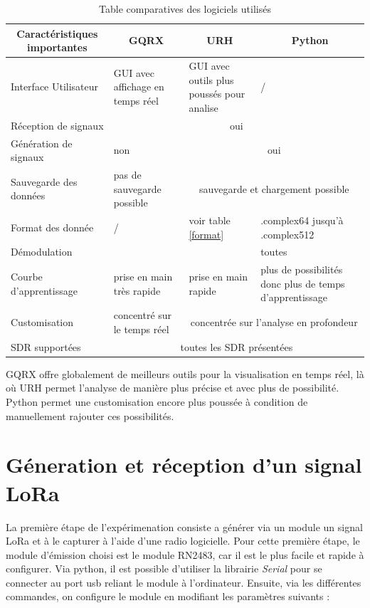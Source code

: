 \begin{table}[h]
\centering
\begin{tabular}{|p{4cm}|p{2cm}|p{2cm}|p{3cm}|}
\hline
\multicolumn{1}{|c|}{Caractéristiques importantes} & \multicolumn{1}{c|}{GQRX} & \multicolumn{1}{c|}{URH} & \multicolumn{1}{c|}{Python}\\
\hline
Interface Utilisateur & GUI avec affichage en temps réel & GUI avec outils plus poussés pour analise & / \\
\hline
Réception de signaux & \multicolumn{3}{c|}{oui} \\
\hline
Génération de signaux & non & \multicolumn{2}{c|}{oui} \\
\hline
Sauvegarde des données & pas de sauvegarde possible & \multicolumn{2}{c|}{sauvegarde et chargement possible} \\
\hline
Format des donnée & / & voir table \ref{format} & .complex64 jusqu'à .complex512 \\
\hline
Démodulation &  &  & toutes\\
\hline
Courbe d'apprentissage & prise en main très rapide & prise en main rapide & plus de possibilités donc plus de temps d'apprentissage \\
\hline
Customisation & concentré sur le temps réel & \multicolumn{2}{c|}{concentrée sur l'analyse en profondeur} \\
\hline
SDR supportées & \multicolumn{3}{c|}{toutes les SDR présentées} \\
\hline
\end{tabular}
\caption{Table comparatives des logiciels utilisés}
\label{table2}
\end{table}

GQRX offre globalement de meilleurs outils pour la visualisation en temps réel, là où URH permet l'analyse de manière plus précise et avec plus de possibilité. Python permet une customisation encore plus poussée à condition de manuellement rajouter ces possibilités.

\section{Géneration et réception d'un signal LoRa} \label{signallora}

La première étape de l'expérimenation consiste a générer via un module un signal LoRa et à le capturer à l'aide d'une radio logicielle. Pour cette première étape, le module d'émission choisi est le module RN2483, car il est le plus facile et rapide à configurer.
Via python, il est possible d'utiliser la librairie \textit{Serial} pour se connecter au port usb reliant le module à l'ordinateur. Ensuite, via les différentes commandes, on configure le module en modifiant les paramètres suivants : 

